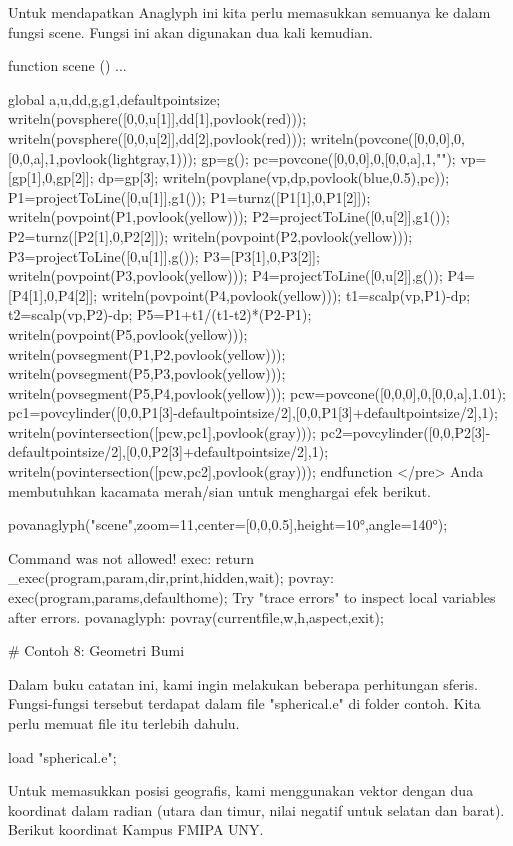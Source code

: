 \documentclass{article}
\begin{document}
Untuk mendapatkan Anaglyph ini kita perlu memasukkan semuanya ke dalam
fungsi scene. Fungsi ini akan digunakan dua kali kemudian.


\>function scene () ...


    global a,u,dd,g,g1,defaultpointsize;
    writeln(povsphere([0,0,u[1]],dd[1],povlook(red)));
    writeln(povsphere([0,0,u[2]],dd[2],povlook(red)));
    writeln(povcone([0,0,0],0,[0,0,a],1,povlook(lightgray,1)));
    gp=g();
    pc=povcone([0,0,0],0,[0,0,a],1,"");
    vp=[gp[1],0,gp[2]]; dp=gp[3];
    writeln(povplane(vp,dp,povlook(blue,0.5),pc));
    P1=projectToLine([0,u[1]],g1()); P1=turnz([P1[1],0,P1[2]]);
    writeln(povpoint(P1,povlook(yellow)));
    P2=projectToLine([0,u[2]],g1()); P2=turnz([P2[1],0,P2[2]]);
    writeln(povpoint(P2,povlook(yellow)));
    P3=projectToLine([0,u[1]],g()); P3=[P3[1],0,P3[2]];
    writeln(povpoint(P3,povlook(yellow)));
    P4=projectToLine([0,u[2]],g()); P4=[P4[1],0,P4[2]];
    writeln(povpoint(P4,povlook(yellow)));
    t1=scalp(vp,P1)-dp; t2=scalp(vp,P2)-dp; P5=P1+t1/(t1-t2)*(P2-P1);
    writeln(povpoint(P5,povlook(yellow)));
    writeln(povsegment(P1,P2,povlook(yellow)));
    writeln(povsegment(P5,P3,povlook(yellow)));
    writeln(povsegment(P5,P4,povlook(yellow)));
    pcw=povcone([0,0,0],0,[0,0,a],1.01);
    pc1=povcylinder([0,0,P1[3]-defaultpointsize/2],[0,0,P1[3]+defaultpointsize/2],1);
    writeln(povintersection([pcw,pc1],povlook(gray)));
    pc2=povcylinder([0,0,P2[3]-defaultpointsize/2],[0,0,P2[3]+defaultpointsize/2],1);
    writeln(povintersection([pcw,pc2],povlook(gray)));
    endfunction
</pre>
Anda membutuhkan kacamata merah/sian untuk menghargai efek berikut.


\>povanaglyph("scene",zoom=11,center=[0,0,0.5],height=10°,angle=140°);


    Command was not allowed!
    exec:
        return _exec(program,param,dir,print,hidden,wait);
    povray:
        exec(program,params,defaulthome);
    Try "trace errors" to inspect local variables after errors.
    povanaglyph:
        povray(currentfile,w,h,aspect,exit); 

# Contoh 8: Geometri Bumi

Dalam buku catatan ini, kami ingin melakukan beberapa perhitungan
sferis. Fungsi-fungsi tersebut terdapat dalam file "spherical.e" di
folder contoh. Kita perlu memuat file itu terlebih dahulu.


\>load "spherical.e";


Untuk memasukkan posisi geografis, kami menggunakan vektor dengan dua
koordinat dalam radian (utara dan timur, nilai negatif untuk selatan
dan barat). Berikut koordinat Kampus FMIPA UNY.
\end{document}

